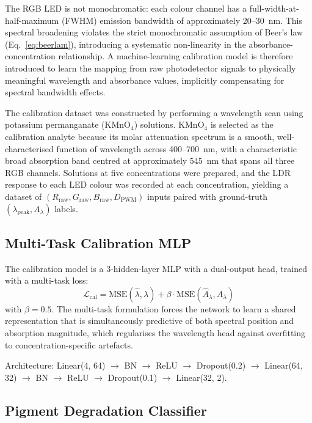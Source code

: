 \documentclass{ieeeaccess}
\begin{document}
The RGB LED is not monochromatic: each colour channel has a full-width-at-half-maximum (FWHM) emission bandwidth of approximately 20--30~nm. This spectral broadening violates the strict monochromatic assumption of Beer's law (Eq.~\ref{eq:beerlam}), introducing a systematic non-linearity in the absorbance-concentration relationship. A machine-learning calibration model is therefore introduced to learn the mapping from raw photodetector signals to physically meaningful wavelength and absorbance values, implicitly compensating for spectral bandwidth effects.

The calibration dataset was constructed by performing a wavelength scan using potassium permanganate (KMnO$_4$) solutions. KMnO$_4$ is selected as the calibration analyte because its molar attenuation spectrum is a smooth, well-characterised function of wavelength across 400--700~nm, with a characteristic broad absorption band centred at approximately 545~nm that spans all three RGB channels. Solutions at five concentrations were prepared, and the LDR response to each LED colour was recorded at each concentration, yielding a dataset of $(R_\text{raw}, G_\text{raw}, B_\text{raw}, D_\text{PWM})$ inputs paired with ground-truth $(\lambda_\text{peak}, A_\lambda)$ labels.

\subsection{Multi-Task Calibration MLP}

The calibration model is a 3-hidden-layer MLP with a dual-output head, trained with a multi-task loss:
\begin{equation}
  \mathcal{L}_{\text{cal}} = \text{MSE}(\hat{\lambda}, \lambda) + \beta \cdot \text{MSE}(\hat{A}_\lambda, A_\lambda)
  \label{eq:multitask}
\end{equation}
with $\beta = 0.5$. The multi-task formulation forces the network to learn a shared representation that is simultaneously predictive of both spectral position and absorption magnitude, which regularises the wavelength head against overfitting to concentration-specific artefacts.

Architecture: Linear(4, 64) $\to$ BN $\to$ ReLU $\to$ Dropout(0.2) $\to$ Linear(64, 32) $\to$ BN $\to$ ReLU $\to$ Dropout(0.1) $\to$ Linear(32, 2).

\subsection{Pigment Degradation Classifier}
\end{document}
